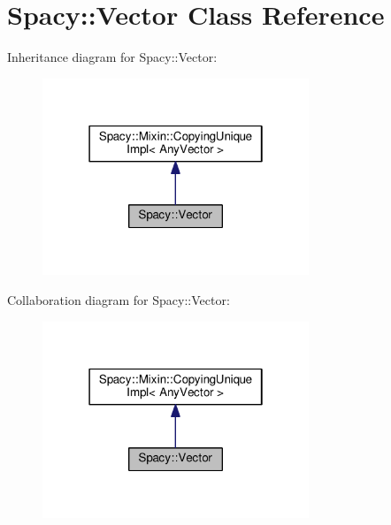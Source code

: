 \hypertarget{classSpacy_1_1Vector}{}\section{Spacy\+:\+:Vector Class Reference}
\label{classSpacy_1_1Vector}


Inheritance diagram for Spacy\+:\+:Vector\+:\nopagebreak
\begin{figure}[H]
\begin{center}
\leavevmode
\includegraphics[width=226pt]{classSpacy_1_1Vector__inherit__graph}
\end{center}
\end{figure}


Collaboration diagram for Spacy\+:\+:Vector\+:\nopagebreak
\begin{figure}[H]
\begin{center}
\leavevmode
\includegraphics[width=226pt]{classSpacy_1_1Vector__coll__graph}
\end{center}
\end{figure}
